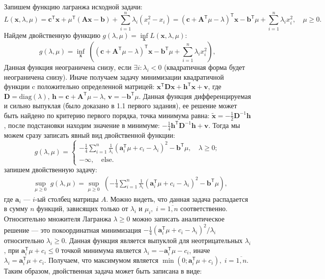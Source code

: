 \documentclass[a4paper,12pt]{article}
\renewcommand{\leq}{\leqslant}
\renewcommand{\geq}{\geqslant}
\renewcommand{\top}{\mathsf{T}}
\begin{document}
\begin{enumerate}
	Запишем функцию лагранжа исходной задачи:
	$$
	L(\mathbf{x},{\lambda},{\mu}) = \mathbf{c}^\top \mathbf{x} + \mu^\top(\mathbf{A}\mathbf{x}-\mathbf{b}) + \sum\limits_{i=1}^n \lambda_i(x_i^2-x_i) = (\mathbf{c}+\mathbf{A}^\top \mu -\lambda)^\top \mathbf{x} - \mathbf{b}^\top \mu + \sum\limits_{i=1}^n \lambda_i x_i^2,\quad \mu \geq 0.
	$$
	Найдем двойственную функцию $g(\lambda,\mu) = \inf\limits_{\mathbf{x}} L(\mathbf{x},{\lambda},{\mu})$:
	$$
	g(\lambda,\mu) = \inf\limits_{\mathbf{x}}\;\left( (\mathbf{c}+\mathbf{A}^\top \mu -\lambda)^\top \mathbf{x} - \mathbf{b}^\top \mu + \sum\limits_{i=1}^n \lambda_i x_i^2\right),
	$$
	Данная функция неограничена снизу, если $\exists i\colon\lambda_i < 0$ (квадратичная форма будет неограничена снизу). Иначе получаем задачу минимизации квадратичной функции c положительно определенной матрицей: $\mathbf{x}^\top\mathbf{D} \mathbf{x} + \mathbf{h}^\top \mathbf{x} + \mathbf{v}$, где $\mathbf{D}= \text{diag}(\lambda)$, $\mathbf{h} = \mathbf{c}+\mathbf{A}^\top \mu -\lambda$, $\mathbf{v} = -\mathbf{b}^\top \mu$. Данная функция дифференцируемая и сильно выпуклая (было доказано в 1.1 первого задания), ее решение может быть найдено по критерию первого порядка, точка минимума равна: $\tilde{\mathbf{x}} = -\frac{1}{2}\mathbf{D}^{-1}\mathbf{h}$, после подстановки находим значение в минимуме: $-\frac{1}{4}\mathbf{h}^\top \mathbf{D}^{-1}\mathbf{h} + \mathbf{v}$. Тогда мы можем сразу записать явный вид двойственной функции:
	\begin{equation*}
		g(\lambda,\mu) = \begin{cases}
			-\frac{1}{4} \sum\limits_{i=1}^{n} \frac{1}{\lambda_i} (\mathbf{a}_i^\top \mu + c_i -\lambda_i)^2 -\mathbf{b}^\top\mu,\quad \lambda \geq 0; \\
			-\infty,\quad\text{else}.
		\end{cases}
	\end{equation*}
	запишем двойственную задачу:
	\begin{equation*}
		\begin{aligned}
			& \sup\limits_{\mu\geq0}\; g(\lambda,\mu) =\sup\limits_{\mu\geq0}\;\left( -\frac{1}{4} \sum\limits_{i=1}^{n} \frac{1}{\lambda_i} (\mathbf{a}_i^\top \mu + c_i -\lambda_i)^2 -\mathbf{b}^\top\mu\right),
		\end{aligned}
	\end{equation*}
	где $\mathbf{a}_i$ --- $i$-ый столбец матрицы $A$. Можно видеть, что данная задача распадается в сумму $n$ функций, зависящих только от $\lambda_i$ и $\mu_i,\;i=\overline{1,n}$ соответственно. Относительно множителя Лагранжа $\lambda\geq0$ можно записать аналитическое решение --- это покоординатная минимизация $-\frac{1}{4}(\mathbf{a}_i^\top \mu + c_i - \lambda_i)^2/\lambda_i$ относительно $\lambda_i\geq0$. Данная функция является выпуклой для неотрицательных $\lambda_i$, при $\mathbf{a}_i^\top \mu + c_i \leq 0$ точкой минимума является $\lambda_i=-\mathbf{a}_i^\top \mu - c_i $, иначе $\lambda_i = \mathbf{a}_i^\top \mu + c_i$. Получаем, что максимумом является $\min(0;\mathbf{a}_i^\top \mu + c_i),\;i=\overline{1,n}$. Таким образом, двойственная задача может быть записана в виде:

\end{enumerate}
\end{document}
